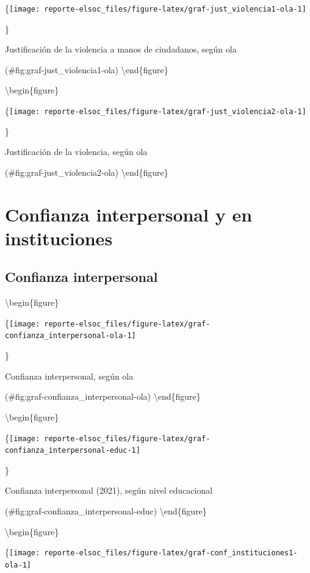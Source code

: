 \documentclass[
  12pt,
]{book}
\begin{document}
\{\centering \texttt{[image: reporte-elsoc\_files/figure-latex/graf-just\_violencia1-ola-1]}

\}

\caption{Justificación de la violencia a manos de ciudadanos, según ola}

(\#fig:graf-just\_violencia1-ola)
\textbackslash end\{figure\}

\textbackslash begin\{figure\}

\{\centering \texttt{[image: reporte-elsoc\_files/figure-latex/graf-just\_violencia2-ola-1]}

\}

\caption{Justificación de la violencia, según ola}

(\#fig:graf-just\_violencia2-ola)
\textbackslash end\{figure\}

\hypertarget{confianza-interpersonal-y-en-instituciones}{%
\section{Confianza interpersonal y en instituciones}\label{confianza-interpersonal-y-en-instituciones}}

\hypertarget{confianza-interpersonal}{%
\subsection{Confianza interpersonal}\label{confianza-interpersonal}}

\textbackslash begin\{figure\}

\{\centering \texttt{[image: reporte-elsoc\_files/figure-latex/graf-confianza\_interpersonal-ola-1]}

\}

\caption{Confianza interpersonal, según ola}

(\#fig:graf-confianza\_interpersonal-ola)
\textbackslash end\{figure\}

\textbackslash begin\{figure\}

\{\centering \texttt{[image: reporte-elsoc\_files/figure-latex/graf-confianza\_interpersonal-educ-1]}

\}

\caption{Confianza interpersonal (2021), según nivel educacional}

(\#fig:graf-confianza\_interpersonal-educ)
\textbackslash end\{figure\}

\textbackslash begin\{figure\}

\{\centering \texttt{[image: reporte-elsoc\_files/figure-latex/graf-conf\_instituciones1-ola-1]}
\end{document}
